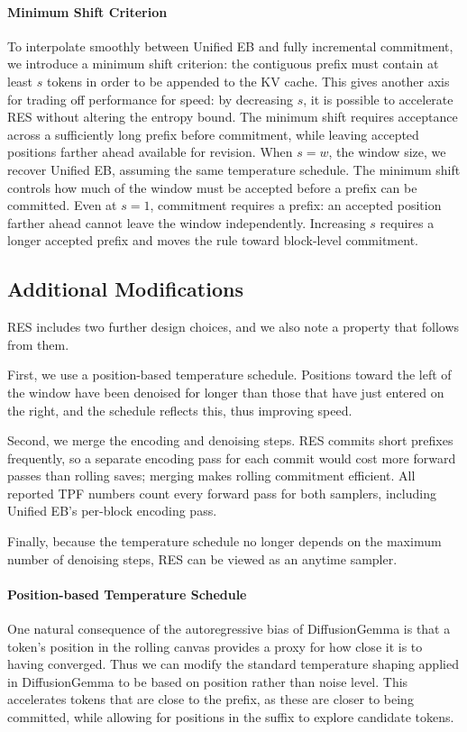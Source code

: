 \paragraph{Minimum Shift Criterion}
To interpolate smoothly between Unified EB and fully incremental commitment, we introduce a minimum shift criterion: the contiguous prefix must contain at least $s$ tokens in order to be appended to the KV cache. This gives another axis for trading off performance for speed: by decreasing $s$, it is possible to accelerate RES without altering the entropy bound.
The minimum shift requires acceptance across a sufficiently long prefix before commitment, while leaving accepted positions farther ahead available for revision.
When $s=w$, the window size, we recover Unified EB, assuming the same temperature schedule.
The minimum shift controls how much of the window must be accepted before a prefix can be committed. Even at $s=1$, commitment requires a prefix: an accepted position farther ahead cannot leave the window independently. Increasing $s$ requires a longer accepted prefix and moves the rule toward block-level commitment.

\subsection{Additional Modifications}
RES includes two further design choices, and we also note a property that follows from them. 

First, we use a position-based temperature schedule. Positions toward the left of the window have been denoised for longer than those that have just entered on the right, and the schedule reflects this, thus improving speed. 

Second, we merge the encoding and denoising steps. RES commits short prefixes frequently, so a separate encoding pass for each commit would cost more forward passes than rolling saves; merging makes rolling commitment efficient. All reported TPF numbers count every forward pass for both samplers, including Unified EB’s per-block encoding pass. 

Finally, because the temperature schedule no longer depends on the maximum number of denoising steps, RES can be viewed as an anytime sampler.
\paragraph{Position-based Temperature Schedule}
One natural consequence of the autoregressive bias of DiffusionGemma is that a token's position in the rolling canvas provides a proxy for how close it is to having converged.
Thus we can modify the standard temperature shaping applied in DiffusionGemma to be based on position rather than noise level.
This accelerates tokens that are close to the prefix, as these are closer to being committed, while allowing for positions in the suffix to explore candidate tokens.

